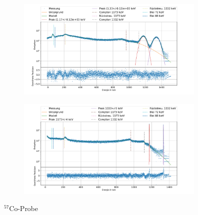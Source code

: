 \documentclass[
	a4paper,
	12pt,
	pagesize,
	ngerman
]{scrartcl}
\begin{document}
\begin{figure}[H]
		\centering
		\begin{subfigure}[c]{\textwidth}
			\centering
			\includegraphics[width= 1 \linewidth]{img/CoNa.pdf}
		\end{subfigure}
		\begin{subfigure}[c]{\textwidth}
			\centering
			\includegraphics[width= 1 \linewidth]{img/CoGe.pdf}
		\end{subfigure}
		\caption{$^{57}$Co-Probe}
		\label{fg_Na}
	\end{figure}
\end{document}
